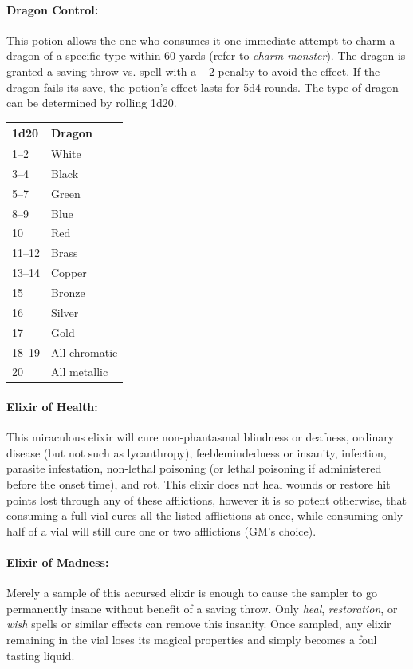 \begin{multicols}{2}
\paragraph{Dragon Control:} This potion allows the one who consumes it one immediate attempt to charm a dragon of a specific type within 60 yards (refer to \textit{charm monster}).  The dragon is granted a saving throw vs. spell with a $-2$ penalty to avoid the effect.  If the dragon fails its save, the potion's effect lasts for 5d4 rounds.  The type of dragon can be determined by rolling 1d20.

\noindent
\begin{tabular}{|p{}|p{}|}
\hline
1d20	& Dragon \\
\hline\hline
\rowcolor[gray]{.9}1--2	& White \\
3--4	& Black \\
\rowcolor[gray]{.9}5--7	& Green \\
8--9	& Blue \\
\rowcolor[gray]{.9}10	& Red \\
11--12	& Brass \\
\rowcolor[gray]{.9}13--14	& Copper \\
15	& Bronze \\
\rowcolor[gray]{.9}16	& Silver \\
17	& Gold \\
\rowcolor[gray]{.9}18--19	& All chromatic \\
20	& All metallic \\
\hline
\end{tabular}

\paragraph{Elixir of Health:} This miraculous elixir will cure non-phantasmal blindness or deafness, ordinary disease (but not such as lycanthropy), feeblemindedness or insanity, infection, parasite infestation, non-lethal poisoning (or lethal poisoning if administered before the onset time), and rot.  This elixir does not heal wounds or restore hit points lost through any of these afflictions, however it is so potent otherwise, that consuming a full vial cures all the listed afflictions at once, while consuming only half of a vial will still cure one or two afflictions (GM's choice).

\paragraph{Elixir of Madness:} Merely a sample of this accursed elixir is enough to cause the sampler to go permanently insane without benefit of a saving throw.  Only \textit{heal}, \textit{restoration}, or \textit{wish} spells or similar effects can remove this insanity.  Once sampled, any elixir remaining in the vial loses its magical properties and simply becomes a foul tasting liquid.


\end{multicols}
